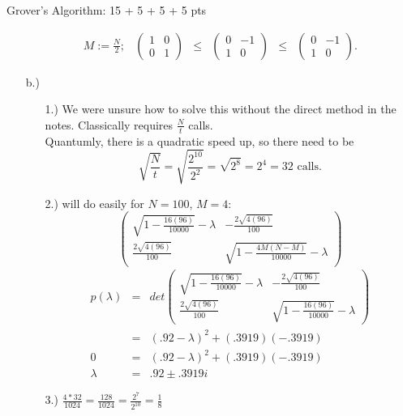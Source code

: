 \documentclass[12pt]{article}
\makeatletter
\newcommand{\<}{\langle}
\renewcommand{\>}{\rangle}
\newenvironment{problem}{\@startsection
       {section}
       {1}
       {-.2em}
       {-3.5ex plus -1ex minus -.2ex}
       {2.3ex plus .2ex}
       {\pagebreak[3]
       \large\bf\noindent{Problem }
       }
       }
       {%
       \begin{center}\large\bf \end{center}}
\makeatother
\begin{document}
\begin{problem}{Grover's Algorithm: 15 + 5 + 5 + 5 pts}
\begin{enumerate}
$$
\begin{array}{cccccc}M := \frac{N}{2};&
\left(\begin{array}{cc}
		1 & 0\\
		0 & 1		
		\end{array}
      \right) 
      &\leq& 
\left(\begin{array}{cc}
	0 & -1\\
	1 & 0
\end{array}\right) 
	 &\leq&
\left(\begin{array}{cc}
		0 & -1\\
		1 & 0
		\end{array}
      \right).
\end{array}
$$

\item[b.)]
\begin{enumerate}
\item[1.)] We were unsure how to solve this without the direct method in the notes. Classically requires $\frac{N}{t}$ calls.\\
\hspace*{1cm} Quantumly, there is a quadratic speed up, so there need to be $$\sqrt{\frac{N}{t}} = \sqrt{\frac{2^{10}}{2^2}} = \sqrt{2^8} = 2^4 = 32 \text{ calls.}$$
\item[2.)] will do easily for $N = 100$, $M = 4$:
$$
\left(\begin{array}{cc}
	\sqrt{1 - \frac{16(96)}{10000}} - \lambda & -\frac{2\sqrt{4(96)}}{100}\\
	\frac{2\sqrt{4(96)}}{100} & \sqrt{1 - \frac{4M(N-M)}{10000}} - \lambda
\end{array}\right)
$$
$$\begin{array}{ccc}
p(\lambda) &=& det\left( \begin{array}{cc}
	\sqrt{1 - \frac{16(96)}{10000}} - \lambda & -\frac{2\sqrt{4(96)}}{100}\\
	\frac{2\sqrt{4(96)}}{100} & \sqrt{1 - \frac{16(96)}{10000}} - \lambda
\end{array} \right)\\

		&=& (.92 - \lambda)^2+(.3919)(-.3919)\\
	0   &=& (.92 - \lambda)^2+(.3919)(-.3919)\\
	\lambda   &=& .92 \pm .3919i
	
\end{array}$$
\item[3.)] $\frac{4*32}{1024} = \frac{128}{1024} = \frac{2^7}{2^10} = \frac{1}{8}$
\end{enumerate} 
\end{enumerate}
\end{problem}
\end{document}
